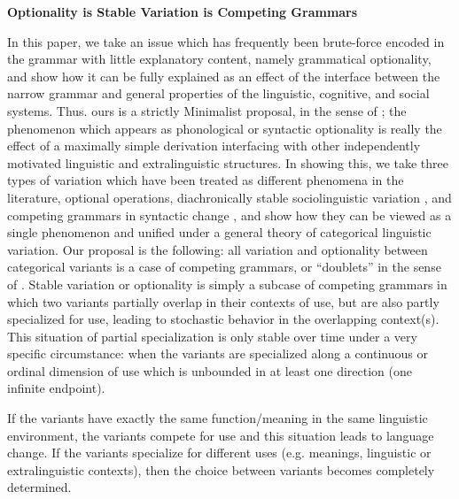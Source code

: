 \documentclass[a4paper,aps,prl,12pt,tightenlines,superscriptaddress]{revtex4}
\title{}%
\begin{document}
\begin{center} \textbf{Optionality is Stable Variation is Competing Grammars}  \end{center}


\noindent In this paper, we take an issue which has frequently been brute-force encoded in the grammar with little explanatory content, namely grammatical optionality, and show how it can be fully explained as an effect of the interface between the narrow grammar and general properties of the linguistic, cognitive, and social systems. Thus. ours is a strictly Minimalist proposal, in the sense of \citep[][inter alia]{chomsky1993, chomsky2001}; the phenomenon which appears as phonological or syntactic optionality is really the effect of a maximally simple derivation interfacing with other independently motivated linguistic and extralinguistic structures. In showing this, we take three types of variation which have been treated as different phenomena in the literature, optional operations, diachronically stable sociolinguistic variation \citep[e.g.][]{labov1989}, and competing grammars in syntactic change \citep[][]{kroch1989}, and show how they can be viewed as a single phenomenon and unified under a general theory of categorical linguistic variation. Our proposal is the following: all variation and optionality between categorical variants is a case of competing grammars, or ``doublets'' in the sense of \citet{kroch1994}. Stable variation or optionality is simply a subcase of competing grammars in which two variants partially overlap in their contexts of use, but are also partly specialized for use, leading to stochastic behavior in the overlapping context(s). This situation of partial specialization is only stable over time under a very specific circumstance: when the variants are specialized along a continuous or ordinal dimension of use which is unbounded in at least one direction (one infinite endpoint).

If the variants have exactly the same function/meaning in the same linguistic environment, the variants compete for use and this situation leads to language change. If the variants specialize for different uses (e.g. meanings, linguistic or extralinguistic contexts), then the choice between variants becomes completely determined.
\end{document}
